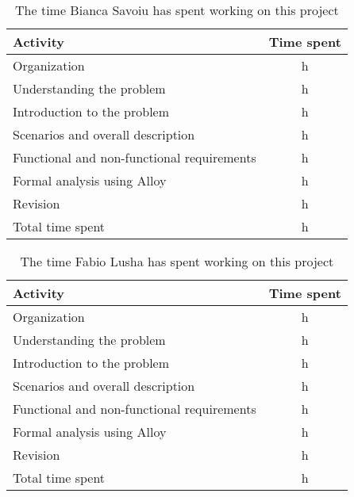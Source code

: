 \label{sec:Effort spent}%
\begin{table}[h!]
    \centering
    \begin{tabular}{|l|c|}
     \hline
     \textbf{Activity} & \textbf{Time spent} \\
    \hline
    Organization & h \\
    \hline
    Understanding the problem & h \\
    \hline
    Introduction to the problem & h \\
    \hline
    Scenarios and overall description & h \\
    \hline
    Functional and non-functional requirements & h \\
    \hline
    Formal analysis using Alloy & h \\
    \hline
    Revision & h \\
    \hline
    Total time spent & h \\
    \hline
\end{tabular}
    \caption{The time Bianca Savoiu has spent working on this project}
    \label{tab:Assumptions}
\end{table}


\begin{table}[h!]
    \centering
    \begin{tabular}{|l|c|}
    \hline
     \textbf{Activity} & \textbf{Time spent} \\
    \hline
    Organization & h \\
    \hline
    Understanding the problem & h \\
    \hline
    Introduction to the problem & h \\
    \hline
    Scenarios and overall description & h \\
    \hline
    Functional and non-functional requirements & h \\
    \hline
    Formal analysis using Alloy & h \\
    \hline
    Revision & h \\
    \hline
    Total time spent & h \\
    \hline
\end{tabular}
    \caption{The time Fabio Lusha has spent working on this project}
    \label{tab:Assumptions}
\end{table}